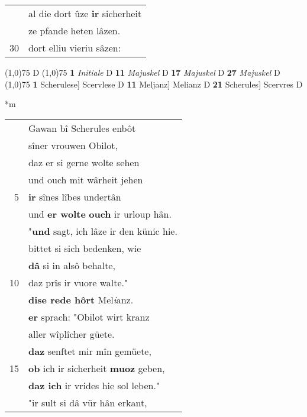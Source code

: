 \documentclass[8pt,a4paper,notitlepage]{article}
\begin{document}
\begin{table}[ht]
\begin{minipage}[t]{0.5\linewidth}
\begin{tabular}{rl}
 & al die dort ûze \textbf{ir} sicherheit\\ 
 & ze pfande heten lâzen.\\ 
30 & dort elliu vieriu sâzen:\\ 
\end{tabular}
\scriptsize
\line(1,0){75} \newline
D \newline
\line(1,0){75} \newline
\textbf{1} \textit{Initiale} D  \textbf{11} \textit{Majuskel} D  \textbf{17} \textit{Majuskel} D  \textbf{27} \textit{Majuskel} D  \newline
\line(1,0){75} \newline
\textbf{1} Scherulese] Scervlese D \textbf{11} Meljanz] Melianz D \textbf{21} Scherules] Scervres D \newline
\end{minipage}
\hspace{0.5cm}
\begin{minipage}[t]{0.5\linewidth}
\small
\begin{center}*m
\end{center}
\begin{tabular}{rl}
 & Gawan bî Scherules enbôt\\ 
 & sîner vrouwen Obilot,\\ 
 & daz er si gerne wolte sehen\\ 
 & und ouch mit wârheit jehen\\ 
5 & \textbf{ir} sînes lîbes undertân\\ 
 & und \textbf{er wolte} \textbf{ouch} ir urloup hân.\\ 
 & "\textbf{und} sagt, ich lâze ir den künic hie.\\ 
 & bittet si sich bedenken, wie\\ 
 & \textbf{dâ} si in alsô behalte,\\ 
10 & daz prîs ir vuore walte."\\ 
 & \textbf{dise rede hôrt} Mel\textit{i}anz.\\ 
 & \textbf{er} sprach: "Obilot wirt kranz\\ 
 & aller wîplîcher güete.\\ 
 & \textbf{daz} senftet mir mîn gemüete,\\ 
15 & \textbf{ob} ich ir sicherheit \textbf{muoz} geben,\\ 
 & \textbf{daz ich} ir vrides hie sol leben."\\ 
 & "ir sult si dâ vür hân erkant,\\ 

\end{tabular}
\end{minipage}
\end{table}
\end{document}
